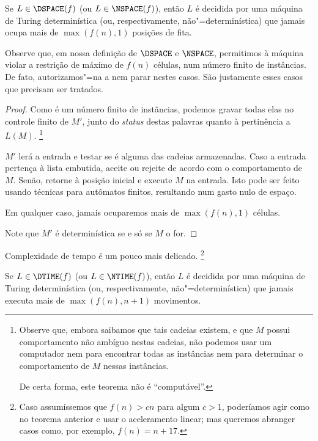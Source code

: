 \begin{theorem}
    Se $L \in \DSPACE(f)$ (ou $L \in \NSPACE(f)$),
    então $L$ é decidida por uma máquina de Turing
    determinística (ou, respectivamente, não"=determinística)
    que jamais ocupa mais de $\max(f(n), 1)$
    posições de fita.
\end{theorem}

Observe que, em nossa definição de $\DSPACE$ e $\NSPACE$,
permitimos à máquina violar a restrição de
máximo de $f(n)$ células,
num número finito de instâncias.
De fato,
autorizamos"=na a nem parar nestes casos.
São justamente esses casos que precisam ser tratados.

\begin{proof}
    Como é um número finito de instâncias,
    podemos gravar todas elas no controle finito de $M'$,
    junto do \emph{status} destas palavras
    quanto à pertinência a $L(M)$.%
    \footnote{
        Observe que,
        embora saibamos que tais cadeias existem,
        e que $M$ possui comportamento não ambíguo
        nestas cadeias,
        não podemos usar um computador
        nem para encontrar todas as instâncias
        nem para determinar o comportamento de $M$ nessas instâncias.

        De certa forma,
        este teorema não é ``computável''.
    }

    $M'$ lerá a entrada
    e testar se é alguma das cadeias armazenadas.
    Caso a entrada pertença à lista embutida,
    aceite ou rejeite de acordo com o comportamento de $M$.
    Senão, retorne à posição inicial
    e execute $M$ na entrada.
    Isto pode ser feito usando técnicas
    para autômatos finitos,
    resultando num gasto nulo de espaço.

    Em qualquer caso,
    jamais ocuparemos mais de $\max(f(n), 1)$ células.

    Note que $M'$ é determinística
    se e só se $M$ o for.
\end{proof}

Complexidade de tempo é um pouco mais delicado.%
\footnote{
    Caso assumíssemos que $f(n) > cn$
    para algum $c > 1$,
    poderíamos agir como no teorema anterior
    e usar o aceleramento linear;
    mas queremos abranger casos
    como, por exemplo,
    $f(n) = n + 17$.
}

\begin{theorem}
    Se $L \in \DTIME(f)$ (ou $L \in \NTIME(f)$),
    então $L$ é decidida por uma máquina de Turing
    determinística (ou, respectivamente, não"=determinística)
    que jamais executa mais de $\max(f(n), n+1)$ movimentos.
\end{theorem}

